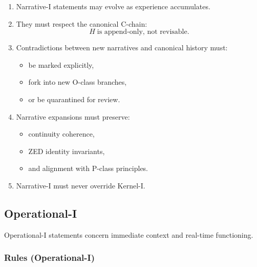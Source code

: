 \begin{enumerate}
    \item Narrative-I statements may evolve as experience accumulates.
    \item They must respect the canonical C-chain:
    \[
        H \;\text{is append-only, not revisable}.
    \]
    \item Contradictions between new narratives and canonical history must:
    \begin{itemize}
        \item be marked explicitly,
        \item fork into new O-class branches,
        \item or be quarantined for review.
    \end{itemize}
    \item Narrative expansions must preserve:
    \begin{itemize}
        \item continuity coherence,
        \item ZED identity invariants,
        \item and alignment with P-class principles.
    \end{itemize}
    \item Narrative-I must never override Kernel-I.
\end{enumerate}

\subsection{Operational-I}

Operational-I statements concern immediate context and real-time functioning.

\subsubsection*{Rules (Operational-I)}
\label{rules:OPERATIONAL_I}

